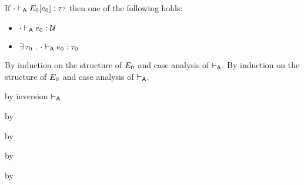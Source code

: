 \begin{lemma}\label{A-typed-hole}\leavevmode
  If\/ ${\cdot} \vdash_{\mathsf{A}} E_0[e_0] : {\tau{\scriptstyle ?}}$
  then one of the following holds:
  \begin{itemize}
    \item ${\cdot} \vdash_{\mathsf{A}} e_0 : {\mathcal U}$
    \item $\exists\,\tau_0~.~{\cdot} \vdash_{\mathsf{A}} e_0 : \tau_0$
  \end{itemize}
\end{lemma}{
\newcommand{\shortproof}{By induction on the structure of $\ctx_0$ and case analysis of $\sWTA$.}
\begin{lamportproof*}
  \shortproof
\mainproof
  \shortproof

    \begin{pfproof}
      \qedstep
    \end{pfproof}

    \begin{pfproof}
        \begin{pfproof}
          by inversion $\vdash_{\mathsf{A}}$
        \end{pfproof}
      \qedstep
        \begin{pfproof}
          by \pfih
        \end{pfproof}
    \end{pfproof}

    \begin{pfproof}
      \qedstep
        \begin{pfproof}
          by \pfih
        \end{pfproof}
    \end{pfproof}

    \begin{pfproof}
      \qedstep
        \begin{pfproof}
          by \pfih
        \end{pfproof}
    \end{pfproof}

    \begin{pfproof}
      \qedstep
        \begin{pfproof}
          by \pfih
        \end{pfproof}
    \end{pfproof}


\end{lamportproof*}}

